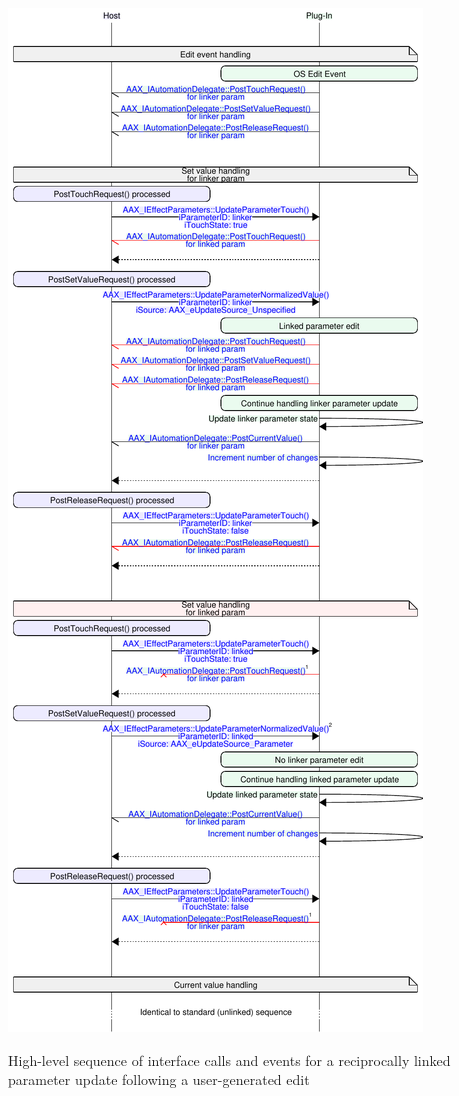 \begin{DoxyImage}
\includegraphics[width=\textwidth,height=\textheight/2,keepaspectratio=true]{msc_AAX_LinkedParameterUpdate_GUI_HighLevel}
\caption{High-\/level sequence of interface calls and events for a reciprocally linked parameter update following a user-\/generated edit}
\end{DoxyImage}
